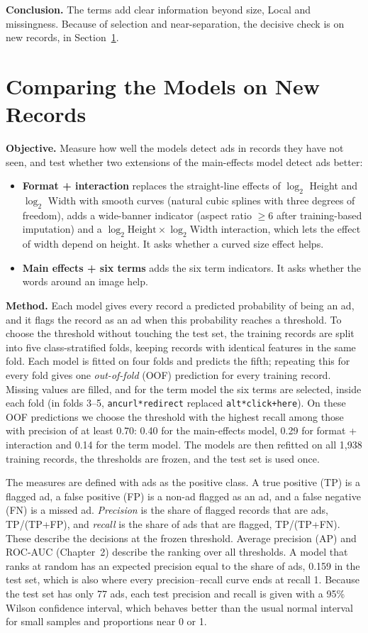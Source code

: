 \textbf{Conclusion.} The terms add clear information beyond size, Local and
missingness. Because of selection and near-separation, the decisive check
is on new records, in Section~\ref{sec:infer-compare}.

\section{Comparing the Models on New Records}
\label{sec:infer-compare}
\textbf{Objective.} Measure how well the models detect ads in records they
have not seen, and test whether two extensions of the main-effects model
detect ads better:
\begin{itemize}
\item \textbf{Format + interaction} replaces the straight-line effects of
  $\log_2$ Height and $\log_2$ Width with smooth curves (natural cubic
  splines with three degrees of freedom), adds a wide-banner indicator
  (aspect ratio $\geq 6$ after training-based imputation) and a
  $\log_2\mathrm{Height}\times\log_2\mathrm{Width}$
  interaction, which lets the effect of width depend on height. It asks
  whether a curved size effect helps.
\item \textbf{Main effects + six terms} adds the six term indicators. It asks
  whether the words around an image help.
\end{itemize}

\textbf{Method.} Each model gives every record a predicted probability of
being an ad, and it flags the record as an ad when this probability reaches
a threshold. To choose the threshold without touching the test set, the
training records are split into five class-stratified folds, keeping records with identical
features in the same fold. Each model is fitted on four folds and predicts
the fifth; repeating this for every fold gives one \emph{out-of-fold} (OOF)
prediction for every training record. Missing values are filled, and for the
term model the six terms are selected, inside each fold (in folds 3--5,
\texttt{ancurl*redirect} replaced \texttt{alt*click+here}). On these OOF
predictions we choose the threshold with the highest recall among those with
precision of at least 0.70: 0.40 for the main-effects model, 0.29 for format
+ interaction and 0.14 for the term model. The models are then refitted on
all 1,938 training records, the thresholds are frozen, and the test set is
used once.

The measures are defined with ads as the positive class. A true positive
(TP) is a flagged ad, a false positive (FP) is a non-ad flagged as an ad,
and a false negative (FN) is a missed ad.
\emph{Precision} is the share of flagged records that are ads,
TP/(TP+FP), and \emph{recall} is the share of ads that are flagged,
TP/(TP+FN). These describe the decisions at the frozen threshold. Average
precision (AP) and ROC-AUC (Chapter~2) describe the ranking over all
thresholds. A model that ranks at random has an expected precision equal to
the share of ads, 0.159 in the test set, which is also where every
precision--recall curve ends at recall 1. Because the test set has only 77 ads, each
test precision and recall is given with a 95\% Wilson confidence interval,
which behaves better than the usual normal interval for small samples and
proportions near 0 or 1.

